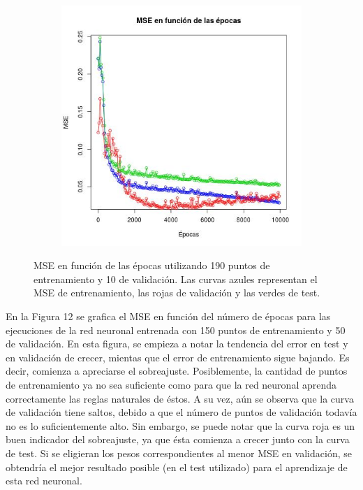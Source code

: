 \documentclass[12pt, a4paper]{article}
\begin{document}
\begin{figure}
\begin{subfigure}[b]{0.45\textwidth}
    \end{subfigure}
      ~ %
    \begin{subfigure}[b]{0.45\textwidth}
        \includegraphics[width=\textwidth]{mse1d}
    \end{subfigure}    
    \caption{MSE en función de las épocas utilizando 190 puntos de entrenamiento y 10 de validación. Las curvas azules representan el MSE de entrenamiento, las rojas de validación y las verdes de test.}
\end{figure}

\bigskip
 
En la Figura 12 se grafica el MSE en función del número de épocas para las ejecuciones de la red neuronal entrenada con 150 puntos de entrenamiento y 50 de validación. En esta figura, se empieza a notar la tendencia del error en test y en validación de crecer, mientas que el error de entrenamiento sigue bajando. Es decir, comienza a apreciarse el sobreajuste. Posiblemente, la cantidad de puntos de entrenamiento ya no sea suficiente como para que la red neuronal aprenda correctamente las reglas naturales de éstos. A su vez, aún se observa que la curva de validación tiene saltos, debido a que el número de puntos de validación todavía no es lo suficientemente alto. Sin embargo, se puede notar que la curva roja es un buen indicador del sobreajuste, ya que ésta comienza a crecer junto con la curva de test. Si se eligieran los pesos correspondientes al menor MSE en validación, se obtendría el mejor resultado posible (en el test utilizado) para el aprendizaje de esta red neuronal.
 
\end{document}

